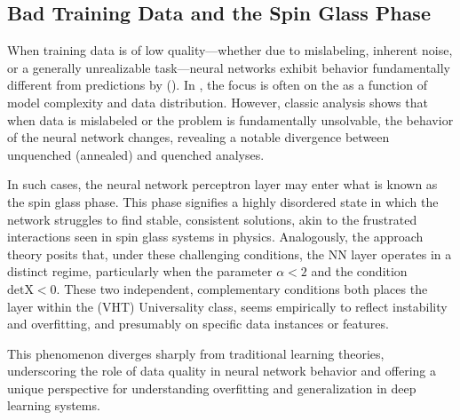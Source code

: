 
\subsection{Bad Training Data and the Spin Glass Phase}
\label{sxn:SMOG_main-spin_glass}



When training data is of low quality—whether due to mislabeling, inherent noise, or a generally unrealizable task—neural networks exhibit behavior fundamentally different from predictions by \StatisticalLearningTheory (\SLT). In \SLT, the focus is often on the \GeneralizationError as a function of model complexity and data distribution. However, classic \STATMECH analysis shows that when data is mislabeled or the problem is fundamentally unsolvable, the behavior of the neural network changes, revealing a notable divergence between unquenched (annealed) and quenched analyses.

In such cases, the neural network perceptron layer may enter what is known as the spin glass phase. This phase signifies a highly disordered state in which the network struggles to find stable, consistent solutions, akin to the frustrated interactions seen in spin glass systems in physics.
Analogously, the \SETOL approach theory posits that, under these challenging conditions, the NN layer operates in a distinct regime,
particularly when the \HTSR parameter  $\alpha < 2$ and the \TRACELOG condition $\mbox{detX} < 0$.
These two independent, complementary conditions both places the layer within the \emph{\VeryHeavyTailed} (VHT) Universality class,
seems empirically to reflect instability and overfitting, and presumably on specific data instances or features.

This phenomenon diverges sharply from traditional learning theories, underscoring the role of data quality in neural network
behavior and offering a unique perspective for understanding overfitting and generalization in deep learning systems.


